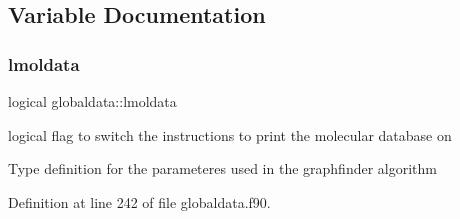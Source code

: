 \subsection{Variable Documentation}
\mbox{\label{namespaceglobaldata_a53b99c0c357633fec26adaf341b563d3}} 
\subsubsection{\texorpdfstring{lmoldata}{lmoldata}}
{\footnotesize\ttfamily logical globaldata\+::lmoldata}



logical flag to switch the instructions to print the molecular database on 

Type definition for the parameteres used in the graphfinder algorithm 

Definition at line 242 of file globaldata.\+f90.

